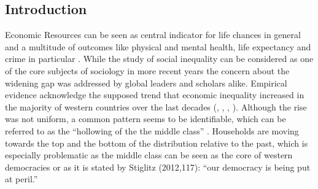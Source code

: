 \documentclass[twoside]{article}\usepackage[]{graphicx}\usepackage[]{color}
\begin{document}
\begin{multicols}{2} %




\section{Introduction}



Economic Resources can be seen as central indicator for life chances in general and a multitude of outcomes like physical and mental health, life expectancy and crime in particular \citep{wilkinson_income_2009}. While the study of social inequality can be considered as one of the core subjects of sociology in more recent years the concern about the widening gap was addressed by global leaders \citep{world_economic_forum_global_2013} and scholars alike. Empirical evidence acknowledge the supposed trend that economic inequality increased in the majority of western countries over the last decades (\citealt{OECD, 2008 FEHLT}, \citealt{oecd_divided_2011}, \citealt{gornick_income_2013}, \citealt{salverda_changing_2014}). Although the rise was not uniform, a common pattern seems to be identifiable, which can be referred to as the ``hollowing of the the middle class'' \citep{Alderson and Doran 2013 FEHLT}. Households are moving towards the top and the bottom of the distribution relative to the past, which is especially problematic as the middle class can be seen as the core of western democracies or as it is stated by Stiglitz (2012,117): ``our democracy is being put at peril.''
\\



\end{multicols}
\end{document}
